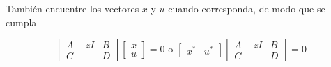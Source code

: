 También encuentre los vectores $x$ y $u$ cuando corresponda, de modo que se cumpla

$$
\left[\begin{array}{cc}
A-z I & B \\
C & D
\end{array}\right]\left[\begin{array}{l}
x \\
u
\end{array}\right]=0 \text { o }\left[\begin{array}{ll}
x^{*} & u^{*}
\end{array}\right]\left[\begin{array}{cc}
A-z I & B \\
C & D
\end{array}\right]=0
$$
